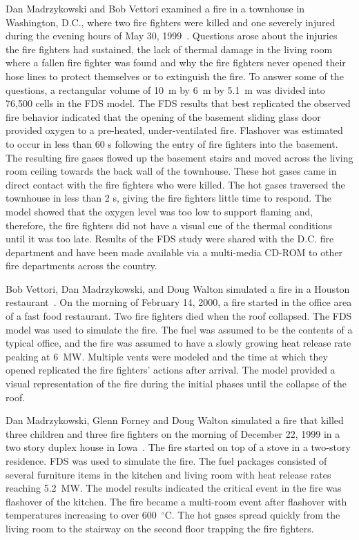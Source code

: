 Dan Madrzykowski and Bob Vettori examined a fire in a townhouse in Washington, D.C., where
two fire fighters were killed and one severely injured during the evening hours of May 30, 1999~\cite{Madrzykowski:1}. Questions arose
about the injuries the fire fighters had sustained, the lack of thermal damage in the living room where a fallen fire fighter was found and why the
fire fighters never opened their hose lines to protect themselves or to extinguish the fire.
To answer some of the questions, a rectangular volume of 10~m by 6~m by 5.1~m was divided into 76,500 cells in the FDS model. The FDS results that
best replicated the observed fire behavior indicated that the opening of the basement sliding glass door provided oxygen to a pre-heated,
under-ventilated fire. Flashover was estimated to occur in less than 60 s following the entry of fire fighters into the basement. The resulting fire
gases flowed up the basement stairs and moved across the living room ceiling towards the back wall of the townhouse. These hot gases came in direct
contact with the fire fighters who were killed. The hot gases traversed the townhouse in less than 2 s, giving the fire fighters little time to
respond. The model showed that the oxygen level was too low to support flaming and, therefore, the fire fighters did not have a visual cue of the
thermal conditions until it was too late. Results of the FDS study were shared with the D.C. fire department and have been made available via a
multi-media CD-ROM to other fire departments across the country.

Bob Vettori, Dan Madrzykowski, and Doug Walton simulated a fire in a Houston restaurant~\cite{Texas}. On the morning of February 14, 2000, a fire started in the
office area of a fast food restaurant. Two fire fighters died when the roof collapsed. The FDS model was used to simulate the fire. The fuel was
assumed to be the contents of a typical office, and the fire was assumed to have a slowly growing heat release rate peaking at 6~MW. Multiple vents
were modeled and the time at which they opened replicated the fire fighters' actions after arrival.  The model provided a visual representation of
the fire during the initial phases until the collapse of the roof.

Dan Madrzykowski, Glenn Forney and Doug Walton simulated a fire that killed three children and three fire fighters on the morning of December 22, 1999 in a
two story duplex house in Iowa~\cite{Iowa}. The fire started on top of a stove in a two-story residence. FDS was used to simulate the fire.
The fuel packages consisted of several furniture items
in the kitchen and living room with heat release rates reaching 5.2~MW. The model results indicated the critical event in the fire was flashover of
the kitchen. The fire became a multi-room event after flashover with temperatures increasing to over 600~$^\circ$C. The hot gases spread quickly from
the living room to the stairway on the second floor trapping the fire fighters.

